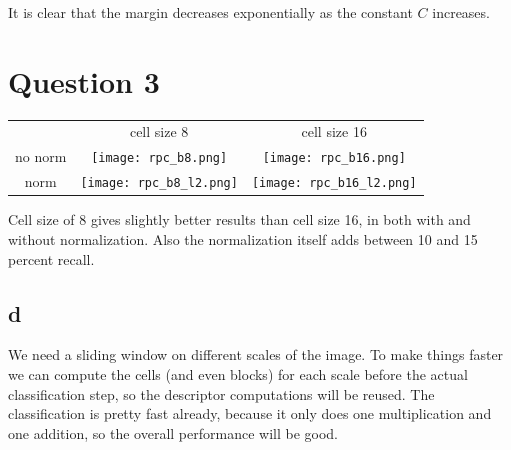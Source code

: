 \documentclass[a4paper]{article}
\begin{document}
It is clear that the margin decreases exponentially as the constant $ C $ increases.

\section*{Question 3}
\begin{tabular}{ccc}
        & cell size 8                              & cell size 16 \\
no norm & \texttt{[image: rpc\_b8.png]} & \texttt{[image: rpc\_b16.png]} \\
norm    & \texttt{[image: rpc\_b8\_l2.png]} & \texttt{[image: rpc\_b16\_l2.png]} \\
\end{tabular}

Cell size of 8 gives slightly better results than cell size 16, in both with and without normalization. Also the normalization itself adds between 10 and 15 percent recall.

\subsection*{d}

We need a sliding window on different scales of the image. To make things
faster we can compute the cells (and even blocks) for each scale before the
actual classification step, so the descriptor computations will be reused. The
classification is pretty fast already, because it only does one multiplication
and one addition, so the overall performance will be good.
\end{document}
